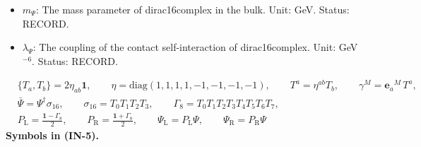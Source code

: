 \documentclass[
  10pt,
]{article}
\begin{document}
\begin{itemize}
  \(D_M,\ D_\mu\): The covariant derivative: on dirac16complex
  \(D_M = \partial_M + \Omega_M\) (with
  \(D_M\bar\Psi = \partial_M\bar\Psi - \bar\Psi\Omega_M\)); on the
  fields of the fold the gauge and spin covariant derivative \(D_\mu\)
  (the partial derivative plus the spin connection of the fold and the
  gauge fields times their couplings and generators);
  \(D^\mu = \hat h^{\mu\nu}D_\nu\); on an adjoint field
  \((D_\mu X)^A = \partial_\mu X^A + g_3f^{ABC}G^B_\mu X^C\) (likewise
  for \(SU(2)\) with \(g_2\epsilon^{IJK}\)). Unit: 1/length. Status:
  STANDARD.
\item
  \(m_\Psi\): The mass parameter of dirac16complex in the bulk. Unit:
  GeV. Status: RECORD.
\item
  \(\lambda_\Psi\): The coupling of the contact self-interaction of
  dirac16complex. Unit: GeV\(^{-6}\). Status: RECORD.
\end{itemize}

\[
\begin{aligned}
&\{T_a, T_b\} = 2\eta_{ab}\mathbf{1},\qquad \eta = \mathrm{diag}(1, 1, 1, 1, -1, -1, -1, -1),\qquad T^a = \eta^{ab}T_b,
 \qquad \gamma^M = \mathbf{e}_a{}^M\,T^a,\\
&\bar\Psi = \Psi^\dagger\sigma_{16},\qquad \sigma_{16} = T_0T_1T_2T_3,\qquad \Gamma_8 = T_0T_1T_2T_3T_4T_5T_6T_7,\\
&P_{\mathrm{L}} = \frac{\mathbf{1} - \Gamma_8}{2},\qquad P_{\mathrm{R}} = \frac{\mathbf{1} + \Gamma_8}{2},\qquad
 \Psi_{\mathrm{L}} = P_{\mathrm{L}}\Psi,\qquad \Psi_{\mathrm{R}} = P_{\mathrm{R}}\Psi
\end{aligned} \tag{IN-5}
\] \textbf{Symbols in (IN-5).}
\end{document}
